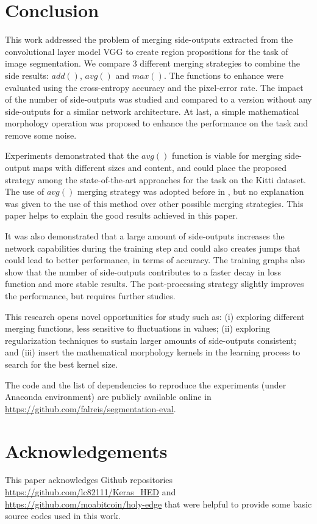 \section{Conclusion}
\label{sec:conclusion}

This work addressed the problem of merging side-outputs extracted from the convolutional layer model VGG to create region propositions for the task of image segmentation. We compare 3 different merging strategies to combine the side results: $add()$, $avg()$ and $max()$. The functions to enhance were evaluated using the cross-entropy accuracy and the pixel-error rate. The impact of the number of side-outputs was studied and compared to a version without any side-outputs for a similar network architecture. At last, a simple mathematical morphology operation was proposed to  enhance the performance on the task and remove some noise. 

Experiments demonstrated that the $avg()$ function is viable for merging side-output maps with different sizes and content, and could place the proposed strategy among the state-of-the-art approaches for the task on the Kitti dataset. The use of $avg()$ merging strategy was adopted before in \cite{liu2017}, but no explanation was given to the use of this method over other possible merging strategies. This paper helps to explain the good results achieved in this paper.

It was also demonstrated that a large amount of side-outputs increases the network capabilities during the training step and could also creates jumps that could lead to better performance, in terms of accuracy. The training graphs also show that the number of side-outputs contributes to a faster decay in loss function and more stable results. The post-processing strategy slightly improves the performance, but requires further studies.

This research opens novel opportunities for study such as: (i) exploring different merging functions, less sensitive to fluctuations in values;  (ii) exploring regularization techniques to sustain larger amounts of side-outputs consistent; and (iii) insert the mathematical morphology kernels in the learning process to search for the best kernel size. 
 
The code and the list of dependencies to reproduce the experiments (under Anaconda environment) are publicly available online in \url{https://github.com/falreis/segmentation-eval}. 

\section{Acknowledgements}
\label{sec:acknowledgements}

This paper acknowledges Github repositories \url{https://github.com/lc82111/Keras_HED} and \url{https://github.com/moabitcoin/holy-edge} that were helpful to provide some basic source codes used in this work.
